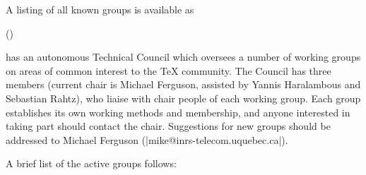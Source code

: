 A listing of all known groups is available as 


\htmlignore
{} ()
\endhtmlignore
\begin{htmlversion}
\end{htmlversion}
has an autonomous Technical Council which oversees a number of working
groups on areas of common interest to the \TeX{} community. The
Council has three members (current chair is Michael Ferguson, assisted
by Yannis Haralambous and Sebastian Rahtz), who liaise with chair
people of each working group. Each group establishes its own working
methods and membership, and anyone interested in taking part should
contact the chair. Suggestions for new groups should be addressed to
Michael Ferguson (\Email|mike@inrs-telecom.uquebec.ca|).

A brief list of the active groups follows:


